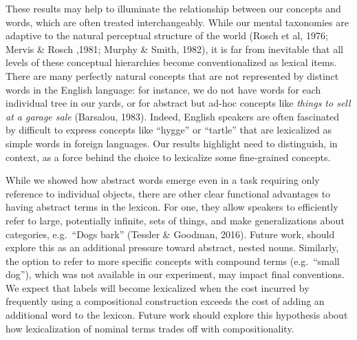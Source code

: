 \documentclass[10pt,letterpaper]{article}
\newcommand{\ndg}[1]{\textcolor{Green}{[ndg: #1]}}
\newcommand{\mf}[1]{\textcolor{Red}{[ndg: #1]}}
\begin{document}
These results may help to illuminate the relationship between our concepts and words, which are often treated interchangeably. While our mental taxonomies are adaptive to the natural perceptual structure of the world (Rosch et al, 1976; Mervis \& Rosch ,1981; Murphy \& Smith, 1982), it is far from inevitable that all levels of these conceptual hierarchies become conventionalized as lexical items. There are many perfectly natural concepts that are not represented by distinct words in the English language: for instance, we do not have words for each individual tree in our yards, or for abstract but ad-hoc concepts like \emph{things to sell at a garage sale} (Barsalou, 1983). Indeed, English speakers are often fascinated by difficult to express concepts like ``hygge'' or ``tartle'' that are lexicalized as simple words in foreign languages.
Our results highlight need to distinguish, in context, as a force behind the choice to lexicalize some fine-grained concepts.

While we showed how abstract words emerge even in a task requiring only reference to individual objects, there are other clear functional advantages to having abstract terms in the lexicon. For one, they allow speakers to efficiently refer to large, potentially infinite, sets of things, and make generalizations about categories, e.g.\ ``Dogs bark'' (Tessler \& Goodman, 2016). Future work, should explore this as an additional pressure toward abstract, nested nouns.
Similarly, the option to refer to more specific concepts with compound terms (e.g.~``small dog''), which was not available in our experiment, may impact final conventions.
We expect that labels will become lexicalized when the cost incurred by frequently using a compositional construction exceeds the cost of adding an additional word to the lexicon. 
Future work should explore this hypothesis about how lexicalization of nominal terms trades off with compositionality. 



\end{document}
